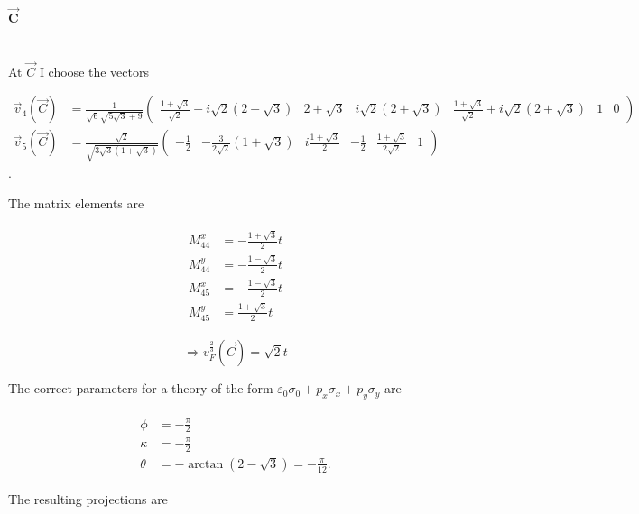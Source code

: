 \documentclass[../../../main.tex]{subfiles}
\begin{document}
\paragraph{$\mathbf{\vec{C}}$} \hfill \\

At $\vec{C}$ I choose the vectors

\begin{align}
	\vec{v}_4(\vec{C}) &= \frac{1}{\sqrt{6}\sqrt{5\sqrt{3}+9}}
	\begin{pmatrix}
		\frac{1+\sqrt{3}}{\sqrt{2}} -i \sqrt{2}(2+\sqrt{3}) & 2 + \sqrt{3} & i\sqrt{2}(2+\sqrt{3}) & \frac{1+\sqrt{3}}{\sqrt{2}} + i \sqrt{2}(2+\sqrt{3}) & 1 & 0
	\end{pmatrix} \\
	\vec{v}_5(\vec{C}) &= \frac{\sqrt{2}}{\sqrt{3\sqrt{3}(1+\sqrt{3})}}
	\begin{pmatrix}
		-\frac{1}{2} & -\frac{3}{2\sqrt{2}}(1+ \sqrt{3}) & i \frac{1+\sqrt{3}}{2} & -\frac{1}{2} & \frac{1+\sqrt{3}}{2\sqrt{2}} & 1
	\end{pmatrix}
\end{align}.

The matrix elements are 

\begin{align}
	\begin{split}
		M_{44}^x &= -\frac{1+\sqrt{3}}{2}t \\
		M_{44}^y &= -\frac{1-\sqrt{3}}{2}t \\
		M_{45}^x &= -\frac{1-\sqrt{3}}{2}t \\
		M_{45}^y &= \frac{1+\sqrt{3}}{2}t
	\end{split}
\end{align}


\begin{equation}
	\Rightarrow v_F^{\frac23}(\vec{C}) = \sqrt{2}t
\end{equation}

The correct parameters for a theory of the form $\varepsilon_0\sigma_0 + p_x\sigma_x + p_y\sigma_y$ are 

\begin{align}
	\begin{split}
		\phi &= -\frac{\pi}{2} \\
		\kappa &= -\frac{\pi}{2} \\
		\theta &= -\arctan(2-\sqrt{3}) = - \frac{\pi}{12}.
	\end{split}
\end{align}

The resulting projections are 
\end{document}

